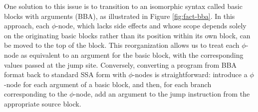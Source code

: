 \documentclass[acmsmall,screen,review]{acmart}
\begin{document}
One solution to this issue is to transition to an isomorphic syntax called basic blocks with
arguments (BBA), as illustrated in Figure \ref{fig:fact-bba}. In this approach, each $\phi$-node,
which lacks side effects and whose scope depends solely on the originating basic blocks rather than
its position within its own block, can be moved to the top of the block. This reorganization allows
us to treat each $\phi$-node as equivalent to an argument for the basic block, with the
corresponding values passed at the jump site. Conversely, converting a program from BBA format back
to standard SSA form with $\phi$-nodes is straightforward: introduce a $\phi$-node for each argument
of a basic block, and then, for each branch corresponding to the $\phi$-node, add an argument to the
jump instruction from the appropriate source block. 
\end{document}
